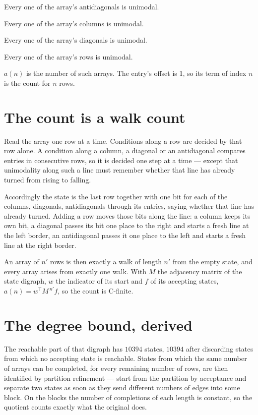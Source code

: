 \documentclass[11pt]{article}
\theoremstyle{definition}
\begin{document}
Every one of the array's antidiagonals is unimodal.

Every one of the array's columns is unimodal.

Every one of the array's diagonals is unimodal.

Every one of the array's rows is unimodal.

$a(n)$ is the number of such arrays. The entry's offset is 1, so its term of index $n$ is the count for $n$ rows.

\section{The count is a walk count}

Read the array one row at a time. Conditions along a row are decided by that row alone. A condition along a column, a diagonal or an antidiagonal compares entries in consecutive rows, so it is decided one step at a time --- except that unimodality along such a line must remember whether that line has already turned from rising to falling.

Accordingly the state is the last row together with one bit for each of the columns, diagonals, antidiagonals through its entries, saying whether that line has already turned. Adding a row moves those bits along the line: a column keeps its own bit, a diagonal passes its bit one place to the right and starts a fresh line at the left border, an antidiagonal passes it one place to the left and starts a fresh line at the right border.

An array of $n'$ rows is then exactly a walk of length $n'$ from the empty state, and every array arises from exactly one walk. With $M$ the adjacency matrix of the state digraph, $w$ the indicator of its start and $f$ of its accepting states, $a(n) = w^{\mathsf T}M^{\,n'}f$, so the count is C-finite.

\section{The degree bound, derived}

The reachable part of that digraph has $10394$ states, $10394$ after discarding states from which no accepting state is reachable. States from which the same number of arrays can be completed, for every remaining number of rows, are then identified by partition refinement --- start from the partition by acceptance and separate two states as soon as they send different numbers of edges into some block. On the blocks the number of completions of each length is constant, so the quotient counts exactly what the original does.
\end{document}
